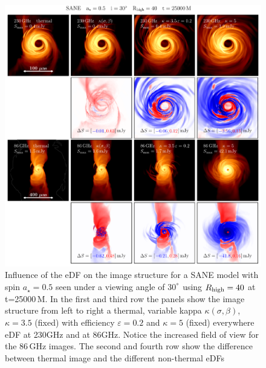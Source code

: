 \begin{figure}[t!]
  \centering
  \includegraphics[width=\textwidth]{./figures/SANE_eDFs_diff.pdf}
  \caption{Influence of the eDF on the image structure for a SANE model with spin $a_{\star}=0.5$ seen under a viewing angle of 30$^\degree$ using $R_{\rm high}=40$ at t=25000\,M. In the first and third row the panels show the image structure from left to right a thermal, variable kappa $\kappa(\sigma,\beta)$, $\kappa=3.5$ (fixed) with efficiency $\varepsilon=0.2$ and $\kappa=5$ (fixed) everywhere eDF at 230GHz and at 86GHz. Notice the increased field of view for the 86\,GHz images. The second and fourth row show the difference between thermal image and the different non-thermal eDFs}
  \label{fig:SANE_edfs}
\end{figure}


